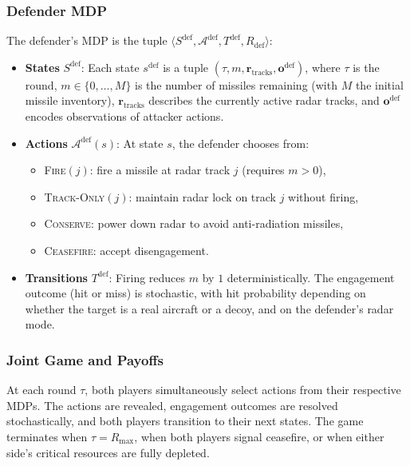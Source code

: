 \documentclass[sigconf]{aamas}
\newcommand{\Sdef}{S^{\mathrm{def}}}
\newcommand{\Adef}{\mathcal{A}^{\mathrm{def}}}
\begin{document}
\subsubsection{Defender MDP}
The defender's MDP is the tuple $\langle \Sdef, \Adef, T^{\mathrm{def}}, R_{\mathrm{def}} \rangle$:
\begin{itemize}
    \item \textbf{States} $\Sdef$: Each state $s^{\mathrm{def}}$ is a tuple $(\tau, m, \mathbf{r}_{\mathrm{tracks}}, \mathbf{o}^{\mathrm{def}})$, where $\tau$ is the round, $m \in \{0, \ldots, M\}$ is the number of missiles remaining (with $M$ the initial missile inventory), $\mathbf{r}_{\mathrm{tracks}}$ describes the currently active radar tracks, and $\mathbf{o}^{\mathrm{def}}$ encodes observations of attacker actions.
    \item \textbf{Actions} $\Adef(s)$: At state $s$, the defender chooses from:
    \begin{itemize}
        \item \textsc{Fire}$(j)$: fire a missile at radar track $j$ (requires $m > 0$),
        \item \textsc{Track-Only}$(j)$: maintain radar lock on track $j$ without firing,
        \item \textsc{Conserve}: power down radar to avoid anti-radiation missiles,
        \item \textsc{Ceasefire}: accept disengagement.
    \end{itemize}
    \item \textbf{Transitions} $T^{\mathrm{def}}$: Firing reduces $m$ by $1$ deterministically. The engagement outcome (hit or miss) is stochastic, with hit probability depending on whether the target is a real aircraft or a decoy, and on the defender's radar mode.
\end{itemize}

\subsubsection{Joint Game and Payoffs}
At each round $\tau$, both players simultaneously select actions from their respective MDPs. The actions are revealed, engagement outcomes are resolved stochastically, and both players transition to their next states. The game terminates when $\tau = R_{\max}$, when both players signal ceasefire, or when either side's critical resources are fully depleted.
\end{document}
